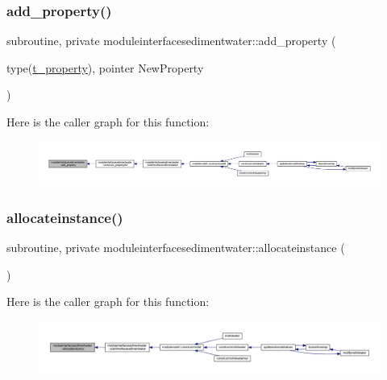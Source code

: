 \subsubsection{\texorpdfstring{add\+\_\+property()}{add\_property()}}
{\footnotesize\ttfamily subroutine, private moduleinterfacesedimentwater\+::add\+\_\+property (\begin{DoxyParamCaption}\item[{type(\mbox{\hyperlink{structmoduleinterfacesedimentwater_1_1t__property}{t\+\_\+property}}), pointer}]{New\+Property }\end{DoxyParamCaption})\hspace{0.3cm}{\ttfamily [private]}}

Here is the caller graph for this function\+:\nopagebreak
\begin{figure}[H]
\begin{center}
\leavevmode
\includegraphics[width=350pt]{namespacemoduleinterfacesedimentwater_aa06e726d01ab265942552440a00f80f8_icgraph}
\end{center}
\end{figure}
\mbox{\label{namespacemoduleinterfacesedimentwater_ab65f957bafcb50f6f38a075ca13833de}} 
\subsubsection{\texorpdfstring{allocateinstance()}{allocateinstance()}}
{\footnotesize\ttfamily subroutine, private moduleinterfacesedimentwater\+::allocateinstance (\begin{DoxyParamCaption}{ }\end{DoxyParamCaption})\hspace{0.3cm}{\ttfamily [private]}}

Here is the caller graph for this function\+:\nopagebreak
\begin{figure}[H]
\begin{center}
\leavevmode
\includegraphics[width=350pt]{namespacemoduleinterfacesedimentwater_ab65f957bafcb50f6f38a075ca13833de_icgraph}
\end{center}
\end{figure}
\mbox{\label{namespacemoduleinterfacesedimentwater_a474f4e07894c361e5aaa94f48648a6b1}} 
